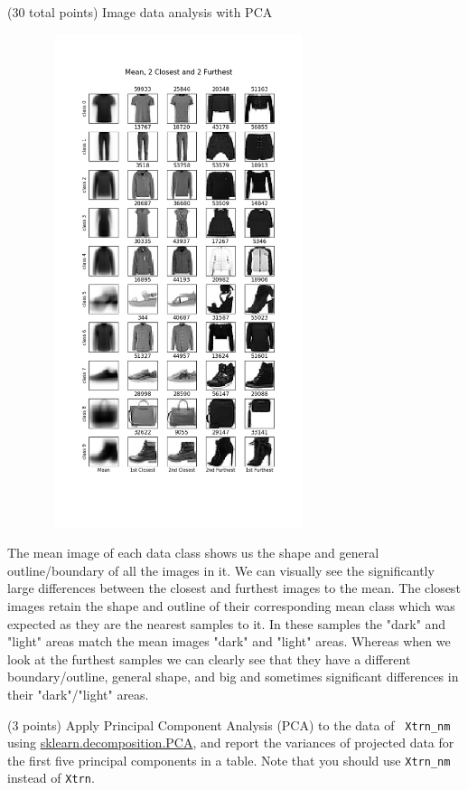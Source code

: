 \documentclass[12pt]{article}
\begin{document}
\begin{question}{(30 total points) Image data analysis with PCA}
\begin{subquestion}
  \begin{answerbox}{52em}
    \begin{center}
        \includegraphics[width=0.75\textwidth, height=39em]{results/1_2.png}
    \end{center}
    The mean image of each data class shows us the shape and general outline/boundary of all the images in it. We can visually see the significantly large differences between the closest and furthest images to the mean. The closest images retain the shape and outline of their corresponding mean class which was expected as they are the nearest samples to it. In these samples the "dark" and "light" areas match the mean images "dark" and "light" areas. Whereas when we look at the furthest samples we can clearly see that they have a different boundary/outline, general shape, and big and sometimes significant differences in their "dark"/"light" areas. 
  \end{answerbox}



   \end{subquestion}

   \begin{subquestion}{(3 points)
       Apply Principal Component Analysis (PCA) to the data of {\tt
         Xtrn\_nm} using
       \href{https://scikit-learn.org/0.19/modules/generated/sklearn.decomposition.PCA.html}{sklearn.decomposition.PCA},
       and report the variances of projected data for the first five principal
       components in a table. Note that you should use {\tt Xtrn\_nm} instead of {\tt Xtrn}.} 
    \label{Q1.pca.variance}
     



\end{subquestion}
\end{question}
\end{document}
